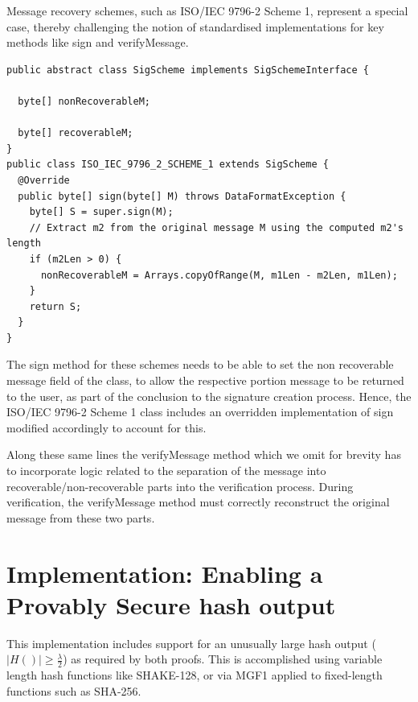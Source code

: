 \documentclass[]{final_report}
\theoremstyle{definition}
\begin{document}
Message recovery schemes, such as ISO/IEC 9796-2 Scheme 1, represent a special case, thereby challenging the notion of standardised implementations for key methods like sign and verifyMessage.
\begin{lstlisting}[caption=Implementation changes for Message Recovery Schemes]
public abstract class SigScheme implements SigSchemeInterface {

  byte[] nonRecoverableM;

  byte[] recoverableM;
}
public class ISO_IEC_9796_2_SCHEME_1 extends SigScheme {
  @Override
  public byte[] sign(byte[] M) throws DataFormatException {
    byte[] S = super.sign(M);
    // Extract m2 from the original message M using the computed m2's length
    if (m2Len > 0) {
      nonRecoverableM = Arrays.copyOfRange(M, m1Len - m2Len, m1Len);
    }
    return S;
  }
}
 \end{lstlisting}
The sign method for these schemes needs to be able to set the non recoverable message field of the class, to allow the respective portion message to be returned to the user, as part of the conclusion to the signature creation process. Hence, the ISO/IEC 9796-2 Scheme 1 class includes an overridden implementation of sign modified accordingly to account for this.

Along these same lines the verifyMessage method which we omit for brevity has to incorporate logic related to the separation of the message into recoverable/non-recoverable parts into the verification process. During verification, the verifyMessage method must correctly reconstruct the original message from these two parts. 

\section{Implementation: Enabling a Provably Secure hash output}
\label{hashOutput} 

This implementation includes support for an unusually large hash output (\(|H()| \ge \frac{\lambda}{2}\)) as required by both proofs. This is accomplished using variable length hash functions like SHAKE-128, or via MGF1 applied to fixed-length functions such as SHA-256.
\end{document}
